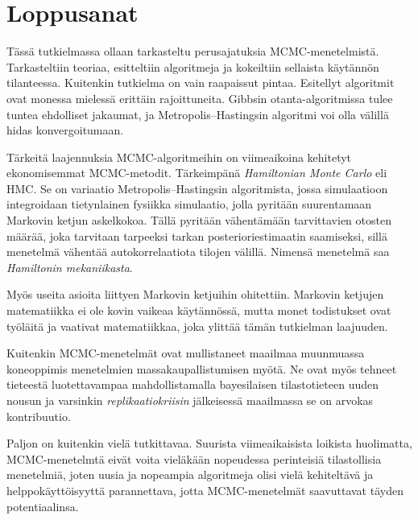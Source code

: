 \chapter{Loppusanat}

Tässä tutkielmassa ollaan tarkasteltu perusajatuksia MCMC-menetelmistä. Tarkasteltiin teoriaa, esitteltiin algoritmeja ja kokeiltiin sellaista käytännön tilanteessa. Kuitenkin tutkielma on vain raapaissut pintaa. Esitellyt algoritmit ovat monessa mielessä erittäin rajoittuneita. Gibbsin otanta-algoritmissa tulee tuntea ehdolliset jakaumat, ja Metropolis--Hastingsin algoritmi voi olla välillä hidas konvergoitumaan.

Tärkeitä laajennuksia MCMC-algoritmeihin on viimeaikoina kehitetyt ekonomisemmat MCMC-metodit. Tärkeimpänä \textit{Hamiltonian Monte Carlo} eli HMC. Se on variaatio Metropolis--Hastingsin algoritmista, jossa simulaatioon integroidaan tietynlainen fysiikka simulaatio, jolla pyritään suurentamaan Markovin ketjun askelkokoa. Tällä pyritään vähentämään tarvittavien otosten määrää, joka tarvitaan tarpeeksi tarkan posterioriestimaatin saamiseksi, sillä menetelmä vähentää autokorrelaatiota tilojen välillä. Nimensä menetelmä saa \emph{Hamiltonin mekaniikasta}.

Myös useita asioita liittyen Markovin ketjuihin ohitettiin. Markovin ketjujen matematiikka ei ole kovin vaikeaa käytännössä, mutta monet todistukset ovat työläitä ja vaativat matematiikkaa, joka ylittää tämän tutkielman laajuuden.

Kuitenkin MCMC-menetelmät ovat mullistaneet maailmaa muunmuassa koneoppimis menetelmien massakaupallistumisen myötä. Ne ovat myös tehneet tieteestä luotettavampaa mahdollistamalla bayesilaisen tilastotieteen uuden nousun ja varsinkin \emph{replikaatiokriisin} jälkeisessä maailmassa se on arvokas kontribuutio.

Paljon on kuitenkin vielä tutkittavaa. Suurista viimeaikaisista loikista huolimatta, MCMC-menetelmtä eivät voita vieläkään nopeudessa perinteisiä tilastollisia menetelmiä, joten uusia ja nopeampia algoritmeja olisi vielä kehiteltävä ja helppokäyttöisyyttä parannettava, jotta MCMC-menetelmät saavuttavat täyden potentiaalinsa.
